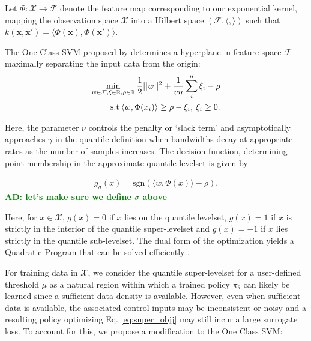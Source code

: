 \documentclass[10pt, conference]{ieeeconf}      %
\newcommand{\bx}{\mathbf{x}}
\newcommand{\adnote}[1]{\ifthenelse{\boolean{include-notes}}%
 {\textcolor{green}{\textbf{AD: #1}}}{}}
\begin{document}
Let $\Phi:\mathcal{X}\to \mathcal{F}$ denote the feature map corresponding to our exponential kernel, mapping the
observation space $\mathcal{X}$ into a Hilbert space $(\mathcal{F}, \langle, \rangle)$ such that $k(\bx, \bx') = \langle
\Phi(\bx), \Phi(\bx')\rangle$.

The One Class SVM proposed by \cite{scholkopf2001estimating} determines a hyperplane in feature space $\mathcal{F}$
maximally separating the input data from the origin:
\vspace{-2ex}
\begin{align}\label{eq:primal_sup}
    \underset{w\in \mathcal{F}, \mathbf{\xi} \in \mathbb{R}, \rho \in \mathbb{R}}{\mbox{min}}\: \frac{1}{2}||w||^2+\frac{1}{vn} \sum^n_i \xi_i - \rho\\
\mbox{s.t} \: \langle w,\Phi(x_i) \rangle \geq \rho - \xi_i, \: \xi_i \geq 0 \notag.
\end{align}

Here, the parameter $\nu$ controls the penalty or `slack term' and asymptotically approaches $\gamma$ \cite{vert2006consistency}
in the quantile definition when bandwidths decay at appropriate rates as the number of samples increases. The decision
function, determining point membership in the approximate quantile levelset is given by

\vspace{-2ex}
\begin{align}\label{eq:decision_func}
g_{\sigma}(x) = \mbox{sgn}(\langle w,\Phi(x) \rangle-\rho).
\end{align}
\adnote{let's make sure we define $\sigma$ above}

Here, for $x\in \mathcal{X}$, $g(x)=0$ if $x$ lies on the quantile levelset,
$g(x) = 1$ if $x$ is strictly in the interior of the quantile super-levelset and $g(x) = -1$ 
if $x$ lies strictly in the quantile sub-levelset. The dual form of the optimization yields a Quadratic Program 
that can be solved efficiently \cite{scholkopf2001estimating}. 

For training data in $\mathcal{X}$, we consider the quantile super-levelset for a user-defined threshold $\mu$ as a natural region within which
a trained policy $\pi_{\theta}$ can likely be learned since a sufficient data-density is available.
However, even when sufficient data is available, the associated control inputs may be inconsistent or noisy and a resulting policy
optimizing Eq. \ref{eq:super_objj} may still incur a large surrogate loss. To account for this, we propose a
modification to the One Class SVM:
\end{document}
